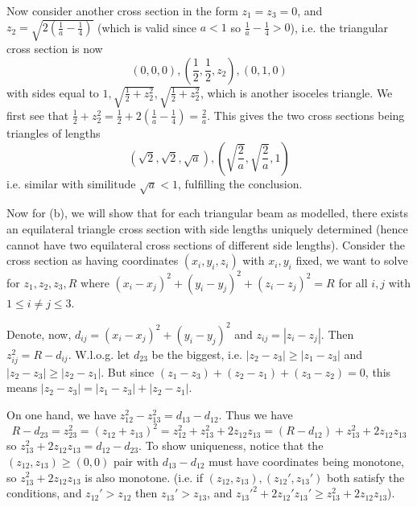 \documentclass[11pt,a4paper]{article}
\begin{document}
\begin{enumerate}
    Now consider another cross section in the form $z_1 = z_3 = 0$, and $z_2 = \sqrt{2(\frac 1a - \frac 14)}$ 
    (which is valid since $a < 1$ so $\frac 1a - \frac 14 > 0$), 
    i.e. the triangular cross section is now 
    \[
    (0, 0, 0), (\frac 12, \frac 12, z_2), (0, 1, 0)
    \]
    with sides equal to 
    $1, \sqrt{\frac 12 + z_2^2}, \sqrt{\frac 12 + z_2^2}$, 
    which is another isoceles triangle. 
    We first see that $\frac 12 + z_2^2
    =\frac 12 + 2(\frac 1a - \frac 14) = \frac 2a$. 
    This gives the two cross sections being triangles of lengths 
    \[
    (\sqrt{2}, \sqrt{2}, \sqrt{a}), (\sqrt{\frac 2a}, \sqrt{\frac 2a}, 1)
    \]
    i.e. similar with similitude $\sqrt{a} < 1$, fulfilling the conclusion. 
    
    Now for (b), we will show that for each triangular beam as modelled, 
    there exists an equilateral triangle cross section with side lengths uniquely determined 
    (hence cannot have two equilateral cross sections of different side lengths). 
    Consider the cross section as having coordinates $(x_i, y_i, z_i)$ with $x_i, y_i$ fixed, 
    we want to solve for $z_1, z_2, z_3, R$ where $(x_i - x_j)^2 + (y_i - y_j)^2 + (z_i - z_j)^2 = R$ for all $i, j$ with $1\le i\neq j\le 3$. 
    
    Denote, now, $d_{ij} = (x_i - x_j)^2 + (y_i - y_j)^2$ and $z_{ij} = |z_i - z_j|$. 
    Then $z_{ij}^2 = R - d_{ij}$. 
    W.l.o.g. let $d_{23}$ be the biggest, i.e. $|z_2-z_3|\ge |z_1 - z_3|$ and $|z_2-z_3| \ge |z_2 - z_1|$. 
    But since $(z_1 - z_3) + (z_2 - z_1) + (z_3 - z_2) = 0$, 
    this means $|z_2-z_3| = |z_1 - z_3| + |z_2 - z_1|$. 
    
    On one hand, we have $z_{12}^2 - z_{13}^2 = d_{13} - d_{12}$. 
    Thus we have 
    \[
    R - d_{23} = 
    z_{23}^2 = (z_{12} + z_{13})^2 = z_{12}^2 + z_{13}^2 + 2z_{12}z_{13} = (R - d_{12}) + z_{13}^2 + 2z_{12}z_{13}
    \]
    so $z_{13}^2 + 2z_{12}z_{13} = d_{12} - d_{23}$. 
    To show uniqueness, 
    notice that the $(z_{12}, z_{13})\ge (0, 0)$ pair with $d_{13} - d_{12}$ must have coordinates being monotone, so $z_{13}^2 + 2z_{12}z_{13}$ is also monotone. 
    (i.e. if $(z_{12}, z_{13}), (z_{12}', z_{13}')$ both satisfy the conditions, 
    and $z_{12}'> z_{12}$ then $z_{13}'> z_{13}$, 
    and $z_{13}'^2 + 2z_{12}'z_{13}' \ge z_{13}^2 + 2z_{12}z_{13}$). 
    

\end{enumerate}
\end{document}

